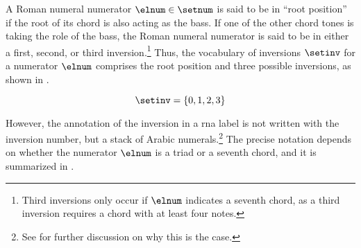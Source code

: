 
A Roman numeral numerator $\elnum \in \setnum$ is said to be
in ``root position'' if the root of its chord is also acting
as the bass. If one of the other chord tones is taking the
role of the bass, the Roman numeral numerator is said to be
in either a first, second, or third
inversion.\footnote{Third inversions only occur if $\elnum$
indicates a seventh chord, as a third inversion requires a
chord with at least four notes.} Thus, the vocabulary of
inversions $\setinv$ for a numerator $\elnum$ comprises the
root position and three possible inversions, as shown in
.

\begin{equation}
    \label{eq:inversion_vocabulary}
    \setinv = \{ 0, 1, 2, 3 \}
\end{equation}

However, the annotation of the inversion in a \gls{rna}
label is not written with the inversion number, but a stack
of Arabic numerals.\footnote{See
 for further
discussion on why this is the case.} The precise notation
depends on whether the numerator $\elnum$ is a triad or a
seventh chord, and it is summarized in .


        
